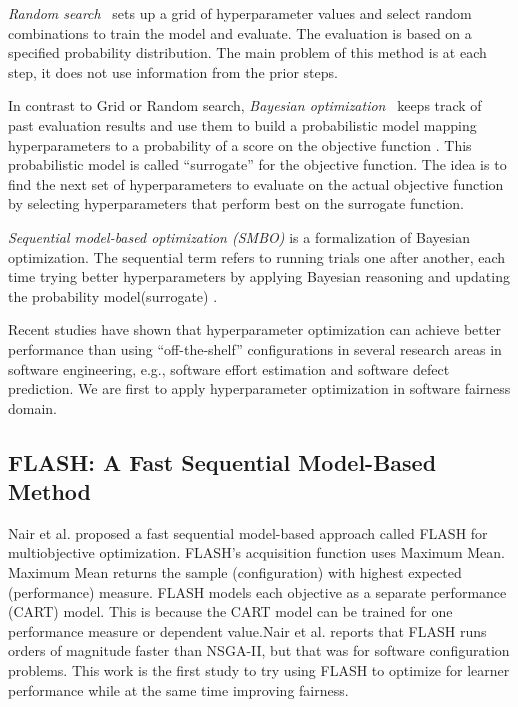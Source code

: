 \documentclass[10pt,conference]{IEEEtran}
\begin{document}
\textit{Random search}~\cite{bergstra2012random} sets up a grid of hyperparameter values and select random combinations to train the model and evaluate. The evaluation is based on a specified probability distribution. The main problem of this method is at each step, it does not use information from the prior steps. 

In contrast to Grid or Random search, \textit{Bayesian optimization}~\cite{pelikan1999boa} keeps track of past evaluation results and use them to build a probabilistic model mapping hyperparameters to a probability of a score on the objective function \cite{Will_Koehrsen}. This probabilistic model is called ``surrogate'' for the objective function. The idea is to find the next set of hyperparameters to evaluate on the actual objective function by selecting hyperparameters that perform best on the surrogate function.

\textit{Sequential model-based optimization (SMBO)} \cite{10.1007/978-3-642-25566-3_40} is a formalization of Bayesian optimization. The sequential term refers to running trials one after another, each time trying better hyperparameters by applying Bayesian reasoning and updating the probability model(surrogate) \cite{Will_Koehrsen}.

Recent studies have shown that hyperparameter optimization can achieve better performance than using ``off-the-shelf'' configurations in several research areas in software engineering, e.g., software effort estimation\cite{xia2018hyperparameter} and software defect prediction\cite{osman2017hyperparameter}. We are first to apply hyperparameter optimization in software fairness domain.

\subsection{FLASH: A Fast Sequential Model-Based Method}
Nair et al. \cite{8469102} proposed a fast sequential model-based approach called FLASH for multiobjective optimization. FLASH's acquisition function uses Maximum Mean. Maximum Mean returns the sample (configuration) with highest expected (performance) measure. FLASH models each objective as a separate performance (CART) model. This is because the CART model can be trained for one performance measure or dependent value.Nair et al. reports that FLASH runs orders of magnitude faster than NSGA-II, but that was for software configuration problems. This work is the first study to try using  FLASH to optimize for learner performance while at the same time improving fairness.
\end{document}
